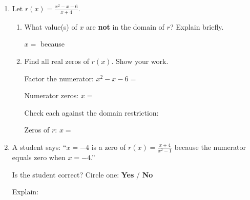 \documentclass[10pt]{article}
\begin{document}
\namedateperiod

\vspace{0.14in}

\begin{enumerate}[itemsep=16pt]

\item Let $\displaystyle r(x) = \frac{x^2 - x - 6}{x + 4}$.

      \begin{enumerate}[label=(\alph*), itemsep=10pt]
        \item What value(s) of $x$ are \textbf{not} in the domain of $r$?
              Explain briefly.

              \vspace{0.08in}
              $x = $ \blank{3cm} because \blank{7cm}

        \item Find all real zeros of $r(x)$. Show your work.

              \vspace{0.06in}
              Factor the numerator: $x^2 - x - 6 = $ \blank{5cm}

              \vspace{0.08in}
              Numerator zeros: $x = $ \blank{4cm}

              \vspace{0.08in}
              Check each against the domain restriction: \blank{6cm}

              \vspace{0.08in}
              Zeros of $r$: $x = $ \blank{4cm}
      \end{enumerate}

\item A student says: ``$x = -4$ is a zero of
      $\displaystyle r(x) = \frac{x + 4}{x^2 - 1}$ because the numerator equals zero
      when $x = -4$.''

      Is the student correct? Circle one: \quad \textbf{Yes} \quad / \quad \textbf{No}

      \vspace{0.08in}
      Explain:

      \vspace{0.08in}

\end{enumerate}
\end{document}
